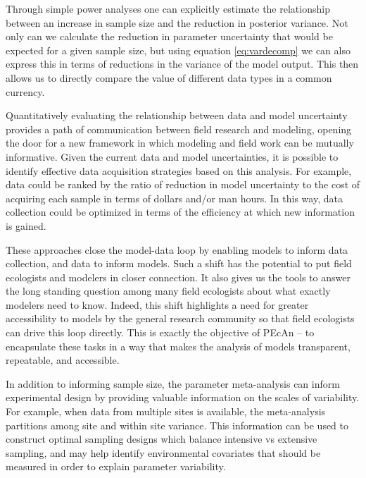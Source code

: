 \documentclass[12pt]{article}
\begin{document}
\begin{flushleft}
\begin{spacing}{1.9}
 Through simple power analyses one can explicitly estimate the relationship between an increase in sample size and the reduction in posterior variance.
 Not only can we calculate the reduction in parameter uncertainty that would be expected for a given sample size, but using equation \ref{eq:vardecomp} we can also express this in terms of reductions in the variance of the model output.
 This then allows us to directly compare the value of different data types in a common currency. 

 Quantitatively evaluating the relationship between data and model uncertainty provides a path of communication between field research and modeling, opening the door for a new framework in which modeling and field work can be mutually informative. 
 Given the current data and model uncertainties, it is possible to identify effective data acquisition strategies based on this analysis.
 For example, data could be ranked by the ratio of reduction in model uncertainty to the cost of acquiring each sample in terms of dollars and/or man hours. 
 In this way, data collection could be optimized in terms of the efficiency at which new information is gained. 

 These approaches close the model-data loop by enabling models to inform data collection, and data to inform models.
 Such a shift has the potential to put field ecologists and modelers in closer connection. It also gives us the tools to answer the long standing question among many field ecologists about what exactly modelers need to know.
 Indeed, this shift highlights a need for greater accessibility to models by the general research community so that field ecologists can drive this loop directly.
 This is exactly the objective of PEcAn -- to encapsulate these tasks in a way that makes the analysis of models transparent, repeatable, and accessible.

  In addition to informing sample size, the parameter meta-analysis can inform experimental design by providing valuable information on the scales of variability.
 For example, when data from multiple sites is available, the meta-analysis partitions among site and within site variance.
 This information can be used to  construct optimal sampling designs which balance intensive vs extensive sampling, and may help identify environmental covariates that should be measured in order to explain parameter variability.


\end{spacing}
\end{flushleft}
\end{document}
